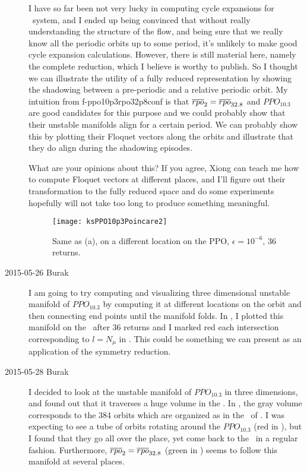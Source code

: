 \begin{description}
I have so far been not very lucky in computing cycle expansions for
\KS\ system, and I ended up being convinced that without really
understanding the structure of the flow, and being sure that we
really know all the periodic orbits up to some period, it's unlikely
to make good cycle expansion calculations. However, there is still
material here, namely the complete  reduction, which I believe
is worthy to publish. So I thought we can illustrate the utility of
a fully reduced representation by showing the shadowing between a
pre-periodic and a relative periodic orbit. My intuition from 
{f-ppo10p3rpo32p8conf} is that $\overline{rpo}_{2}=\overline{rpo}_{32.8}$ and $PPO_{10.3}$ are
good candidates for this purpose and we could probably show that
their unstable manifolds align for a certain period. We can probably
show this by plotting their Floquet vectors along the orbits and
illustrate that they do align during the shadowing episodes.

What are your opinions about this? If you agree, Xiong can teach me how
to compute Floquet vectors at different places, and I'll figure out
their transformation to the fully reduced space and do some
experiments hopefully will not take too long to produce something
meaningful.

\begin{figure}[ht]
\begin{center}
    \texttt{[image: ksPPO10p3Poincare2]}
\end{center}
    \caption[]{
      Same as  (a), on a different location on
      the PPO, $\epsilon = 10^{-6}$, 36 returns.
    }
    \label{f-ppo10p3UnstMan2}
\end{figure}

\item[2015-05-26 Burak] I am going to try computing and visualizing
three dimensional unstable manifold of $PPO_{10.3}$ by computing it at
different locations on the orbit and then connecting end points until
the manifold folds. In , I plotted this
manifold on the \PoincSec\ after 36 returns and I marked red
each intersection corresponding to $l = N_\mu$ in
. This could be something we can present as an
application of the symmetry reduction.

\item[2015-05-28 Burak] I decided to look at the unstable manifold
 of $PPO_{10.3}$ in three dimensions, and
found out that it traverses a huge volume in the \statesp . In
, the gray volume corresponds to the 384 orbits
which are organized as in the \PoincSec\ of
. I was expecting to see a tube of orbits
rotating around the $PPO_{10.3}$ (red in ), but I
found that they go all over the place, yet come back to the \PoincSec\
in a regular fashion. Furthermore, $\overline{rpo}_{2}=\overline{rpo}_{32.8}$ (green in
\reffig{f-ksPPO1man3D}) seems to follow this manifold at several places.


\end{description}
